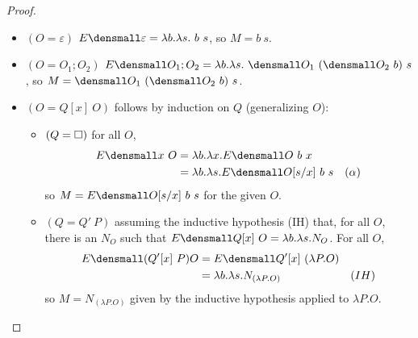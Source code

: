 \begin{proof}
\begin{enumerate}[(a)]
    \begin{itemize}
    \item $(O = \varepsilon)$
      $E\den{\varepsilon} = \lambda b. \lambda s. ~b ~s$, so $M= b ~s$.
    \item $(O = O_1;O_2)$
      $E\den{O_1;O_2} = \lambda b. \lambda s. ~\den{O_1} ~(\den{O_2} ~b) ~s$, so $M = \den{O_1} ~(\den{O_2} ~b) ~s$.
    \item $(O = Q[x] ~O)$ follows by induction on $Q$ (generalizing $O$):
      \begin{itemize}
      \item $(Q=\square)$ for all $O$,
        \begin{align*}
          E\den{x ~O}
          &=
          \lambda b. \lambda x. E\den{O} ~ b ~ x
          \\
          &=
          \lambda b. \lambda s. E\den{O}\subst{x}{s} ~ b ~ s
          &(\alpha)
        \end{align*}
        so $M = E\den{O}\subst{x}{s} ~ b ~ s$ for the given $O$.
      \item $(Q=Q'~P)$
        assuming the inductive hypothesis (IH) that, for all $O$, there is an $N_O$ such that $E\den{Q[x] ~ O} = \lambda b. \lambda s. N_O$.
        For all $O$,
        \begin{align*}
          E\den{(Q'[x] ~ P) O}
          &=
          E\den{Q'[x] ~ (\lambda P. O)}
          \\
          &=
          \lambda b. \lambda s. N_{(\lambda P. O)}
          &(IH)
        \end{align*}
        so $M = N_{(\lambda P. O)}$ given by the inductive hypothesis applied to $\lambda P. O$.

\end{itemize}
\end{itemize}
\end{enumerate}
\end{proof}
